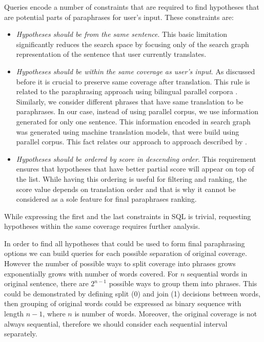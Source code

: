 Queries encode a number of constraints that are required to find hypotheses that are potential parts of paraphrases for user's input. These constraints are:

\begin{itemize}
  \item \emph{Hypotheses should be from the same sentence}. This basic limitation significantly reduces the search space by focusing only of the search graph representation of the sentence that user currently translates.
  \item \emph{Hypotheses should be within the same coverage as user's input}. As discussed before it is crucial to preserve same coverage after translation. This rule is related to the paraphrasing approach using bilingual parallel corpora \cite{Callison-Burch2007}. Similarly, we consider different phrases that have same translation to be paraphrases. In our case, instead of using parallel corpus, we use information generated for only one sentence. This information encoded in search graph was generated using machine translation models, that were build using parallel corpus. This fact relates our approach to approach described by \cite{Callison-Burch2007}.
  \item \emph{Hypotheses should be ordered by score in descending order}. This requirement ensures that hypotheses that have better partial score will appear on top of the list. While having this ordering is useful for filtering and ranking, the score value depends on translation order and that is why it cannot be considered as a sole feature for final paraphrases ranking.
\end{itemize}

While expressing the first and the last constraints in SQL is trivial, requesting hypotheses within the same coverage requires further analysis. 

In order to find all hypotheses that could be used to form final paraphrasing options we can build queries for each possible separation of original coverage. However the number of possible ways to split coverage into phrases grows exponentially grows with number of words covered. For $n$ sequential words in original sentence, there are $2^{n-1}$ possible ways to group them into phrases. This could be demonstrated by defining \textsf{split (0)} and \textsf{join (1)} decisions between words, then grouping of original words could be expressed as binary sequence with length $n-1$, where $n$ is number of words. Moreover, the original coverage is not always sequential, therefore we should consider each sequential interval separately.

